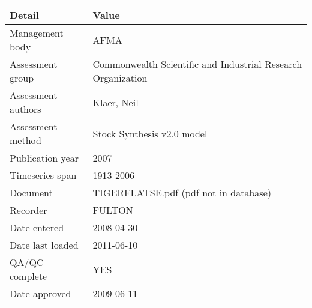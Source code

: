 \begin{table}[htb]
\centering
\begin{tabular}{lp{7cm}}
\toprule
Detail & Value \\
\midrule
Management body    & AFMA                                                         \\
Assessment group   & Commonwealth Scientific and Industrial Research Organization \\
Assessment authors & Klaer, Neil                                                  \\
Assessment method  & Stock Synthesis v2.0 model                                   \\
Publication year   & 2007                                                         \\
Timeseries span    & 1913-2006                                                    \\
Document           & TIGERFLATSE.pdf (pdf not in database)                        \\
Recorder           & FULTON                                                       \\
Date entered       & 2008-04-30                                                   \\
Date last loaded   & 2011-06-10                                                   \\
QA/QC complete     & YES                                                          \\
Date approved      & 2009-06-11                                                   \\
\bottomrule
\end{tabular}
\label{tab:assessdet}
\end{table}
